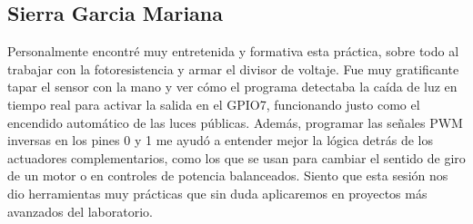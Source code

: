 \subsection{Sierra Garcia Mariana}
Personalmente encontré muy entretenida y formativa esta práctica, sobre todo al trabajar con la fotoresistencia y armar el divisor de voltaje. Fue muy gratificante tapar el sensor con la mano y ver cómo el programa detectaba la caída de luz en tiempo real para activar la salida en el GPIO7, funcionando justo como el encendido automático de las luces públicas. Además, programar las señales PWM inversas en los pines 0 y 1 me ayudó a entender mejor la lógica detrás de los actuadores complementarios, como los que se usan para cambiar el sentido de giro de un motor o en controles de potencia balanceados. Siento que esta sesión nos dio herramientas muy prácticas que sin duda aplicaremos en proyectos más avanzados del laboratorio.
